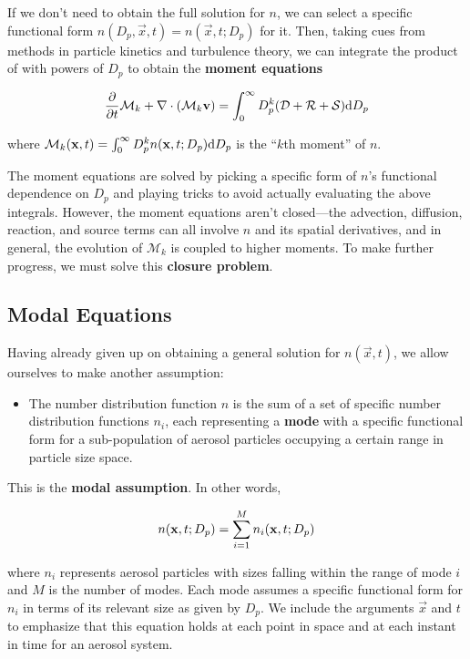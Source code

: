 If we don't need to obtain the full solution for $n$, we can select a specific
functional form $n(D_p, \vec{x}, t) = n(\vec{x}, t; D_p)$ for it. Then, taking cues from
methods in particle kinetics and turbulence theory, we can integrate the product
of  with powers of $D_p$ to obtain the {\bf moment
equations}

\begin{equation}\labeleq{moments}
  \ddt{\mathcal{M}_k} + \div{(\mathcal{M}_k\vec{v})} = \int_0^{\infty} D_p^k (\mathcal{D} + \mathcal{R} + \mathcal{S}) \d{D_p}
\end{equation}

where $\mathcal{M}_k(\mathbf{x}, t) = \int_0^{\infty} D_p^k n(\mathbf{x}, t; D_p) \mathrm{d} D_p$
is the ``$k$th moment'' of $n$.

The moment equations are solved by picking a specific form of $n$'s functional
dependence on $D_p$ and playing tricks to avoid actually evaluating the
above integrals. However, the moment equations aren't closed---the advection,
diffusion, reaction, and source terms can all involve $n$ and its spatial
derivatives, and in general, the evolution of $\mathcal{M}_k$ is coupled to higher
moments. To make further progress, we must solve this {\bf closure problem}.

\subsection*{Modal Equations}

Having already given up on obtaining a general solution for $n(\vec{x}, t)$,
we allow ourselves to make another assumption:

\begin{itemize}
  \item \assume The number distribution function $n$ is the sum of a set of
        specific number distribution functions $n_i$, each representing a
        {\bf mode} with a specific functional form for a sub-population of
        aerosol particles occupying a certain range in particle size space.
\end{itemize}

This is the {\bf modal assumption}. In other words,

\begin{equation}\labeleq{modal_n}
  n(\vec{x}, t; D_p) = \sum_{i=1}^M n_i(\vec{x}, t; D_p)
\end{equation}

where $n_i$ represents aerosol particles with sizes falling within the range
of mode $i$ and $M$ is the number of modes. Each mode assumes a specific
functional form for $n_i$ in terms of its relevant size as given by $D_p$.
We include the arguments $\vec{x}$ and $t$ to emphasize that this equation holds
at each point in space and at each instant in time for an aerosol system.


